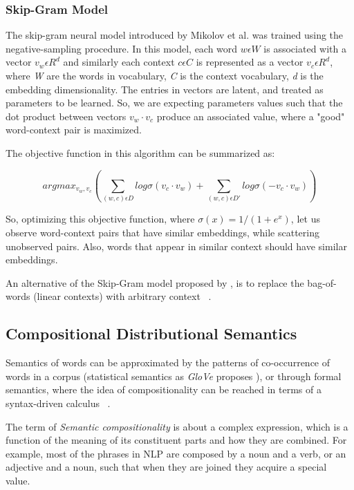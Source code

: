 \subsubsection{Skip-Gram Model}
The skip-gram neural model introduced by Mikolov et al. was trained using the negative-sampling procedure. 
In this model, each word \textit{$w \epsilon W$} is associated with a vector \textit{$v_w \epsilon R^d$} and similarly each context \textit{$c \epsilon C$} is represented as a vector \textit{$v_c \epsilon R^d$}, where \textit{W} are the words in vocabulary, \textit{C} is the context vocabulary, \textit{d} is the embedding dimensionality. The entries in vectors are latent, and treated as parameters to be learned. So, we are expecting parameters values such that the dot product between vectors \textit{$v_w \cdot v_c$} produce an  associated value, where a "good" word-context pair is maximized. 

The objective function in this algorithm can be summarized as:

\begin{center}
\begin{equation}
arg max_{v_w,v_c} (\sum_{(w,c)\epsilon D}log  \sigma(v_c \cdot v_w) + \sum_{(w,c)\epsilon D'}log \sigma(-v_c \cdot v_w))
\end{equation}
\end{center}

So, optimizing this objective function, where \textit{$\sigma(x) = 1/(1+e^x)$}, let us observe word-context pairs that have similar embeddings, while scattering unobserved pairs. Also, words that appear in similar context should have similar embeddings. 

An alternative of the Skip-Gram model proposed by \cite{compositionality2013Mikolov}, is to replace the bag-of-words (linear contexts) with arbitrary context ~\cite{levy2014dependency}.

%
\subsection{Compositional Distributional Semantics}
%

Semantics of words can be approximated by the patterns of co-occurrence of words in a corpus (statistical semantics as \textit{GloVe} proposes \cite{pennington2014GloVe}), or through formal semantics, where the idea of compositionality can be reached in terms of a syntax-driven calculus ~\cite{baroni2014frege}.

The term of \textit{Semantic compositionality} is about a complex expression, which is a function of the meaning of its constituent parts and how they are combined. For example, most of the  phrases in NLP are composed by a noun and a verb, or an adjective and a noun, such that when they are joined they acquire a special value. 

